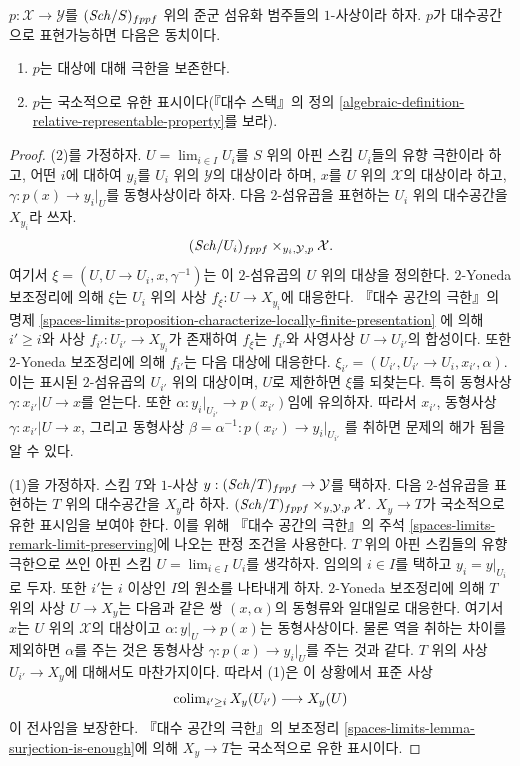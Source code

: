 \begin{lemma}
\label{lemma-representable-by-spaces-limit-preserving}
$p : \mathcal{X} \to \mathcal{Y}$를 $(\mathit{Sch}/S)_{fppf}$ 위의
준군 섬유화 범주들의 $1$-사상이라 하자. $p$가 대수공간으로
표현가능하면 다음은 동치이다.
\begin{enumerate}
\item $p$는 대상에 대해 극한을 보존한다.
\item $p$는 국소적으로 유한 표시이다(『대수 스택』의 정의
\ref{algebraic-definition-relative-representable-property}를 보라).
\end{enumerate}
\end{lemma}

\begin{proof}
(2)를 가정하자. $U = \lim_{i \in I} U_i$를 $S$ 위의 아핀 스킴
$U_i$들의 유향 극한이라 하고, 어떤 $i$에 대하여 $y_i$를
$U_i$ 위의 $\mathcal{Y}$의 대상이라 하며, $x$를
$U$ 위의 $\mathcal{X}$의 대상이라 하고,
$\gamma : p(x) \to y_i|_U$를 동형사상이라 하자. 다음 $2$-섬유곱을
표현하는 $U_i$ 위의 대수공간을 $X_{y_i}$라 쓰자.
$$
(\mathit{Sch}/U_i)_{fppf} \times_{y_i, \mathcal{Y}, p} \mathcal{X}.
$$
여기서 $\xi = (U, U \to U_i, x, \gamma^{-1})$는 이 $2$-섬유곱의
$U$ 위의 대상을 정의한다. $2$-Yoneda 보조정리에 의해 $\xi$는
$U_i$ 위의 사상 $f_\xi : U \to X_{y_i}$에 대응한다.
『대수 공간의 극한』의 명제
\ref{spaces-limits-proposition-characterize-locally-finite-presentation}
에 의해 $i' \geq i$와 사상 $f_{i'} : U_{i'} \to X_{y_i}$가 존재하여
$f_\xi$는 $f_{i'}$와 사영사상 $U \to U_{i'}$의 합성이다.
또한 $2$-Yoneda 보조정리에 의해 $f_{i'}$는 다음 대상에 대응한다.
$\xi_{i'} = (U_{i'}, U_{i'} \to U_i, x_{i'}, \alpha)$.
이는 표시된 $2$-섬유곱의 $U_{i'}$ 위의 대상이며, $U$로 제한하면
$\xi$를 되찾는다. 특히 동형사상
$\gamma : x_{i'}|U \to x$를 얻는다. 또한
$\alpha : y_i|_{U_{i'}} \to p(x_{i'})$임에 유의하자.
따라서 $x_{i'}$, 동형사상 $\gamma : x_{i'}|U \to x$, 그리고 동형사상
$\beta = \alpha^{-1} : p(x_{i'}) \to y_i|_{U_{i'}}$
를 취하면 문제의 해가 됨을 알 수 있다.

\medskip\noindent
(1)을 가정하자. 스킴 $T$와 $1$-사상
$y : (\mathit{Sch}/T)_{fppf} \to \mathcal{Y}$를 택하자. 다음 $2$-섬유곱을
표현하는 $T$ 위의 대수공간을 $X_y$라 하자.
$(\mathit{Sch}/T)_{fppf} \times_{y, \mathcal{Y}, p} \mathcal{X}$.
$X_y \to T$가 국소적으로 유한 표시임을 보여야 한다. 이를 위해
『대수 공간의 극한』의 주석 \ref{spaces-limits-remark-limit-preserving}에
나오는 판정 조건을 사용한다. $T$ 위의 아핀 스킴들의 유향 극한으로
쓰인 아핀 스킴 $U = \lim_{i \in I} U_i$를 생각하자.
임의의 $i \in I$를 택하고 $y_i = y|_{U_i}$로 두자. 또한
$i'$는 $i$ 이상인 $I$의 원소를 나타내게 하자. $2$-Yoneda
보조정리에 의해 $T$ 위의 사상 $U \to X_y$는 다음과 같은 쌍
$(x, \alpha)$의 동형류와 일대일로 대응한다. 여기서 $x$는
$U$ 위의 $\mathcal{X}$의 대상이고
$\alpha : y|_U \to p(x)$는 동형사상이다. 물론 역을 취하는 차이를
제외하면 $\alpha$를 주는 것은 동형사상
$\gamma : p(x) \to y_i|_U$를 주는 것과 같다.
$T$ 위의 사상 $U_{i'} \to X_y$에 대해서도 마찬가지이다.
따라서 (1)은 이 상황에서 표준 사상
$$
\mathop{\mathrm{colim}}\nolimits_{i' \geq i} X_y(U_{i'}) \longrightarrow X_y(U)
$$
이 전사임을 보장한다. 『대수 공간의 극한』의 보조정리
\ref{spaces-limits-lemma-surjection-is-enough}에 의해
$X_y \to T$는 국소적으로 유한 표시이다.
\end{proof}

